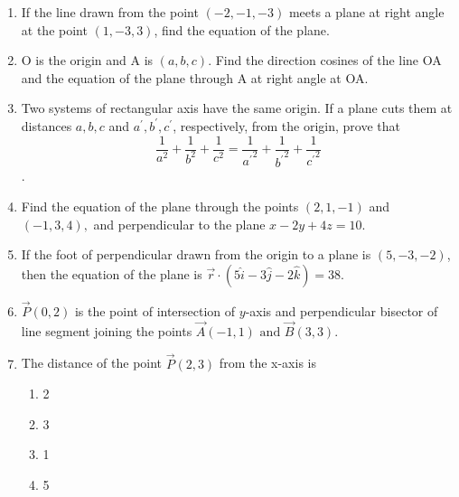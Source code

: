 \begin{enumerate}[label=\thesubsection.\arabic*,ref=\thesubsection.\theenumi]
\item If the line drawn from the point $(-2,-1,-3)$ meets a plane at right angle at the point $(1,-3,3)$, find the equation of the plane.
\item O is the origin and A is $(a,b,c)$. Find the direction cosines of the line OA and the equation of the plane through A at right angle at OA.
\item Two systems of rectangular axis have the same origin. If a plane cuts them at distances $a,b,c$ and $a^{\prime},b^{\prime},c^{\prime}$, respectively, from the origin, prove that $$\frac{1}{a^2}+\frac{1}{b^2}+\frac{1}{c^2}=\frac{1}{{a^{\prime}}^2}+\frac{1}{{b^{\prime}}^2}+\frac{1}{{c^{\prime}}^2}$$.
\item Find the equation of the plane through the points $(2,1,-1)$ and $(-1,3,4),$ and 
perpendicular to the plane $x-2y+4z=10.$
\item If the foot of perpendicular drawn from the origin to a plane is $(5,-3,-2)$, then the equation of the plane is $\overrightarrow{r} \cdot (5\hat{i}-3\hat{j}-2\hat{k})=38.$
\item  $\vec{P}(0,2)$ is the point of intersection of $y$-axis and perpendicular bisector of line segment joining the points $\vec{A}(-1,1) \text{ and } \vec{B}(3,3)$.
	\item The distance of the point $\vec{P}(2, 3)$ from the x-axis is

\begin{enumerate}
\item 2
\item 3
\item 1
\item 5 
\end{enumerate}


\end{enumerate}
